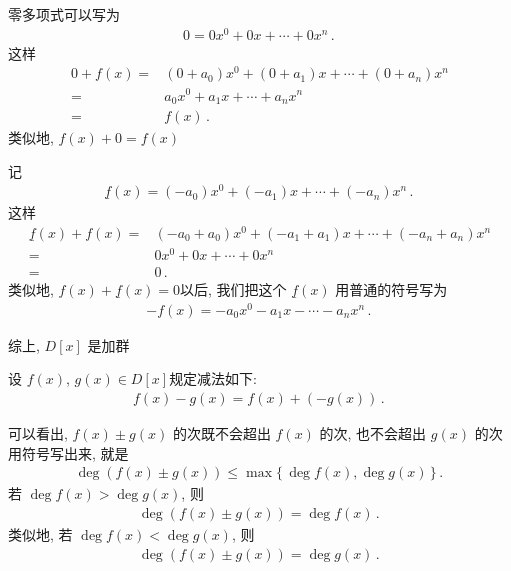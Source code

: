 \begin{pf}
    零多项式可以写为
    \begin{align*}
        0 = 0x^0 + 0x + \cdots + 0x^n \period
    \end{align*}
    这样
    \begin{align*}
        0 + f(x)
        = {} & (0 + a_0) x^0 + (0 + a_1) x + \cdots + (0 + a_n) x^n \\
        = {} & a_0 x^0 + a_1 x + \cdots + a_n x^n                   \\
        = {} & f(x) \period
    \end{align*}
    类似地, $f(x) + 0 = f(x)$\period

    记
    \begin{align*}
        \underline{f}(x) = (-a_0) x^0 + (-a_1) x + \cdots + (-a_n) x^n \period
    \end{align*}
    这样
    \begin{align*}
        \underline{f}(x) + f(x)
        = {} & (-a_0 + a_0) x^0 + (-a_1 + a_1) x + \cdots + (-a_n + a_n) x^n \\
        = {} & 0 x^0 + 0 x + \cdots + 0 x^n                                  \\
        = {} & 0 \period
    \end{align*}
    类似地, $f(x) + \underline{f}(x) = 0$\period 以后, 我们把这个 $\underline{f}(x)$ 用普通的符号写为
    \begin{align*}
        -f(x) = -a_0 x^0 - a_1 x - \cdots - a_n x^n \period
    \end{align*}

    综上, $D[x]$ 是加群\period
\end{pf}

\begin{definition}
    设 $f(x)$, $g(x) \in D[x]$\period 规定减法如下:
    \begin{align*}
        f(x) - g(x) = f(x) + (-g(x)) \period
    \end{align*}
\end{definition}

\begin{remark}
    可以看出, $f(x) \pm g(x)$ 的次既不会超出 $f(x)$ 的次, 也不会超出 $g(x)$ 的次\period 用符号写出来, 就是
    \begin{align*}
        \deg (f(x) \pm g(x)) \leq \max \{\, \deg f(x), \deg g(x) \,\} \period
    \end{align*}
    若 $\deg f(x) > \deg g(x)$, 则
    \begin{align*}
        \deg (f(x) \pm g(x)) = \deg f(x) \period
    \end{align*}
    类似地, 若 $\deg f(x) < \deg g(x)$, 则
    \begin{align*}
        \deg (f(x) \pm g(x)) = \deg g(x) \period
    \end{align*}
\end{remark}

